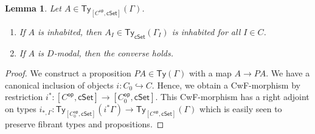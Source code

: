 \documentclass[10pt,a4paper]{article}
\newtheorem{lemma}[theorem]{Lemma}
\theoremstyle{definition}
\theoremstyle{remark}
\newcommand{\cSet}{\mathsf{cSet}}
\DeclareMathOperator\op{\mathsf{op}}
\newcommand\Ty{\mathsf{Ty}}
\newcommand\El{\mathsf{El}}
\begin{document}
\begin{lemma}\label{prop:psh:levelwise-inhabited-if-inhabited}
  Let \(A \in \Ty_{[C^{\op}, \cSet]}(\Gamma)\).
  \begin{enumerate}[label=(\arabic*)]
    \item If \(A\) is inhabited, then \(A_I \in \Ty_{\cSet}(\Gamma_I)\) is inhabited for all \(I \in C\).
    \item If \(A\) is \(D\)-modal, then the converse holds.
  \end{enumerate}
\end{lemma}
\begin{proof}
  We construct a proposition \(PA \in \Ty(\Gamma)\) with a map \(A \to PA\).
  We have a canonical inclusion of objects \(i \colon C_0 \hookrightarrow C\).
  Hence, we obtain a CwF-morphism by restriction \(i^* \colon [C^{\op}, \cSet] \to [C^{\op}_0, \cSet]\).
  This CwF-morphism has a right adjoint on types \(i_{*,\Gamma} \colon \Ty_{[C^{\op}_0, \cSet]}(i^*\Gamma) \to \Ty_{[C^{\op}, \cSet]}(\Gamma)\) which is easily seen to preserve fibrant types and propositions.


\end{proof}
\end{document}
